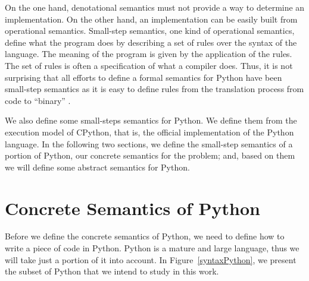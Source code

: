 On the one hand, denotational semantics must not provide a way to determine an implementation.
On the other hand, an implementation can be easily built from operational semantics.
Small-step semantics, one kind of operational semantics, define what the program does by
describing a set of rules over the syntax of the language. The meaning of the program is
given by the application of the rules. The set of rules is often a specification of what a
compiler does. Thus, it is not surprising that all efforts to define a formal semantics for
Python have been small-step semantics as it is easy to define rules from the translation
process from code to \enquote{binary}
\autocites{ranson_semantics_2008}{guth_formal_2013}{politz_python_2013}{fromherz_static_2018}.

We also define some small-steps semantics for Python. We define them from the execution
model of CPython, that is, the official implementation of the Python language. In the
following two sections, we define the small-step semantics of a portion of Python, our
concrete semantics for the problem; and, based on them we will define some abstract
semantics for Python.

\section{Concrete Semantics of Python}

Before we define the concrete semantics of Python, we need to define how to write a piece
of code in Python. Python is a mature and large language, thus we will take just a portion
of it into account. In Figure~\ref{syntaxPython}, we present the subset of Python that we intend to
study in this work.


